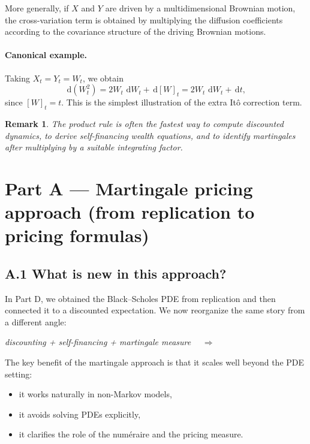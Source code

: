 \documentclass[11pt]{article}
\newcommand{\dd}{\,\mathrm{d}}
\newcommand{\1}{\mathbf{1}}
\newtheorem{remark}{Remark}
\begin{document}
More generally, if \(X\) and \(Y\) are driven by a multidimensional Brownian motion,
the cross-variation term is obtained by multiplying the diffusion coefficients according to the covariance structure of the driving Brownian motions.

\paragraph{Canonical example.}
Taking \(X_t=Y_t=W_t\), we obtain
$$
\dd(W_t^2)=2W_t\,\dd W_t+\dd[W]_t
=2W_t\,\dd W_t+\dd t,
$$
since \([W]_t=t\).
This is the simplest illustration of the extra It\^o correction term.

\begin{remark}
The product rule is often the fastest way to compute discounted dynamics,
to derive self-financing wealth equations, and to identify martingales after multiplying by a suitable integrating factor.
\end{remark}

\section*{Part A --- Martingale pricing approach (from replication to pricing formulas)}

\subsection*{A.1 What is new in this approach?}

In Part D, we obtained the Black--Scholes PDE from replication and then connected it to a discounted expectation.
We now reorganize the same story from a different angle:

\begin{center}
\emph{discounting + self-financing + martingale measure}
$\quad\Longrightarrow\quad
$
\end{center}

The key benefit of the martingale approach is that it scales well beyond the PDE setting:
\begin{itemize}[leftmargin=1.4em]
    \item it works naturally in non-Markov models,
    \item it avoids solving PDEs explicitly,
    \item it clarifies the role of the num\'eraire and the pricing measure.
\end{itemize}
\end{document}
